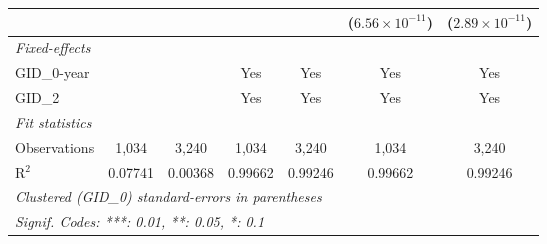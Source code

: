 \begin{table}[H]
\begin{tabular}{lcccccc}
                         &               &                      &                         &                         & ($6.56\times 10^{-11}$)  & ($2.89\times 10^{-11}$)\\    
      \midrule
      \emph{Fixed-effects}\\
      GID\_0-year        &               &                      & Yes                     & Yes                     & Yes                      & Yes\\  
      GID\_2             &               &                      & Yes                     & Yes                     & Yes                      & Yes\\  
      \midrule
      \emph{Fit statistics}\\
      Observations       & 1,034         & 3,240                & 1,034                   & 3,240                   & 1,034                    & 3,240\\  
      R$^2$              & 0.07741       & 0.00368              & 0.99662                 & 0.99246                 & 0.99662                  & 0.99246\\  
      \midrule \midrule
      \multicolumn{7}{l}{\emph{Clustered (GID\_0) standard-errors in parentheses}}\\
      \multicolumn{7}{l}{\emph{Signif. Codes: ***: 0.01, **: 0.05, *: 0.1}}\\
   \end{tabular}
\end{table}



